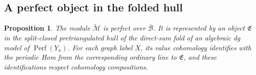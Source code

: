 \documentclass[11pt]{article}
\newtheorem{proposition}[theorem]{Proposition}
\theoremstyle{definition}
\theoremstyle{remark}
\numberwithin{equation}{section}
\begin{document}
\subsection{A perfect object in the folded hull}

\begin{proposition}
\label{per:perfect}
The module $\widetilde{\mathcal M}$ is perfect over
$\overline{\mathcal B}$.  It is represented by an object
$\mathfrak E$ in the split-closed pretriangulated hull of the
direct-sum fold of an algebraic dg model of $\operatorname{Perf}(Y_\kappa)$.  For
each graph label $X$, its value cohomology identifies with the
periodic Hom from the corresponding ordinary line to $\mathfrak E$,
and these identifications respect cohomology compositions.
\end{proposition}
\end{document}
